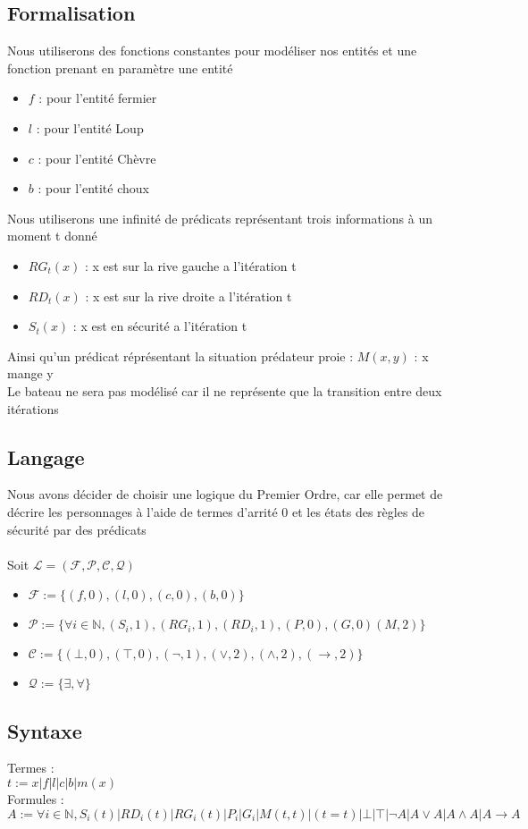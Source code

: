 \documentclass{article}
\newcommand{\N}{\mathbb{N}}
\begin{document}
\subsection{Formalisation}
Nous utiliserons des fonctions constantes pour modéliser nos entités et une fonction prenant en paramètre une entité
\begin{itemize}
  \item $f$ : pour l’entité fermier
  \item $l$ : pour l’entité Loup
  \item $c$ : pour l’entité Chèvre
  \item $b$ : pour l’entité choux
\end{itemize}
Nous utiliserons une infinité de prédicats représentant trois informations à un moment t donné
\begin{itemize}
  \item $RG_t(x)$ : x est sur la rive gauche a l’itération t
  \item $RD_t(x)$ : x est sur la rive droite a l’itération t
  \item $S_t(x)$ : x est en sécurité a l’itération t
\end{itemize}
Ainsi qu'un prédicat réprésentant la situation prédateur proie :
$M(x,y)$ : x mange y\\
Le bateau ne sera pas modélisé car il ne représente que la transition entre deux itérations
\subsection{Langage}
Nous avons décider de choisir une logique du Premier Ordre, car elle permet de décrire les personnages
à l’aide de termes d’arrité 0 et les états des règles de sécurité par des prédicats \\
\\
Soit $\mathcal{L} = (\mathcal{F} ,\mathcal{P} ,\mathcal{C} ,\mathcal{Q} )$
\begin{itemize}
  \item $ \mathcal{F} := \{(f,0),(l,0),(c,0),(b,0)\}$
  \item $ \mathcal{P} := \{\forall i \in \N,(S_i,1),(RG_i,1),(RD_i,1),(P,0),(G,0)(M,2)\} $
  \item $ \mathcal{C} := \{(\bot , 0),(\top , 0),(\neg , 1), (\vee , 2), (\wedge , 2), (\rightarrow , 2)\}$
  \item $ \mathcal{Q} := \{\exists, \forall \}$
\end{itemize}
\subsection{Syntaxe}
Termes : \\
$t := x|f|l|c|b|m(x)$ \\
Formules : \\
$A := \forall i \in\N, S_i(t)|RD_i(t)|RG_i(t)|P_i|G_i|M(t,t)|(t=t)| \bot|\top|\neg A|A\vee A|A\wedge A|A \rightarrow A$
\end{document}
